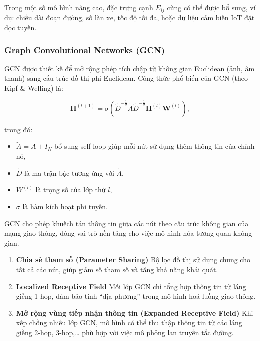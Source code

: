 Trong một số mô hình nâng cao, đặc trưng cạnh $E_{ij}$ cũng có thể được bổ sung, ví dụ: chiều dài đoạn đường, số làn xe, tốc độ tối đa, hoặc dữ liệu cảm biến IoT đặt dọc tuyến.

\subsubsection{Graph Convolutional Networks (GCN)}


GCN được thiết kế để mở rộng phép tích chập từ không gian Euclidean (ảnh, âm thanh) sang cấu trúc đồ thị phi Euclidean. Công thức phổ biến của GCN (theo Kipf \& Welling) là:

\begin{equation}
\mathbf{H}^{(l+1)} = \sigma\left(\tilde{D}^{-\frac{1}{2}} \tilde{A} \tilde{D}^{-\frac{1}{2}} \mathbf{H}^{(l)} \mathbf{W}^{(l)}\right),
\end{equation}

trong đó:
\begin{itemize}
    \item $\tilde{A} = A + I_N$ bổ sung self-loop giúp mỗi nút sử dụng thêm thông tin của chính nó,
    \item $\tilde{D}$ là ma trận bậc tương ứng với $\tilde{A}$,
    \item $W^{(l)}$ là trọng số của lớp thứ $l$,
    \item $\sigma$ là hàm kích hoạt phi tuyến.
\end{itemize}

GCN cho phép khuếch tán thông tin giữa các nút theo cấu trúc không gian của mạng giao thông, đóng vai trò nền tảng cho việc mô hình hóa tương quan không gian.

\begin{enumerate}
    \item \textbf{Chia sẻ tham số (Parameter Sharing)}  
    Bộ lọc đồ thị sử dụng chung cho tất cả các nút, giúp giảm số tham số và tăng khả năng khái quát.

    \item \textbf{Localized Receptive Field}  
    Mỗi lớp GCN chỉ tổng hợp thông tin từ láng giềng 1-hop, đảm bảo tính “địa phương” trong mô hình hoá luồng giao thông.

    \item \textbf{Mở rộng vùng tiếp nhận thông tin (Expanded Receptive Field)}  
    Khi xếp chồng nhiều lớp GCN, mô hình có thể thu thập thông tin từ các láng giềng 2-hop, 3-hop,… phù hợp với việc mô phỏng lan truyền tắc đường.
\end{enumerate}

